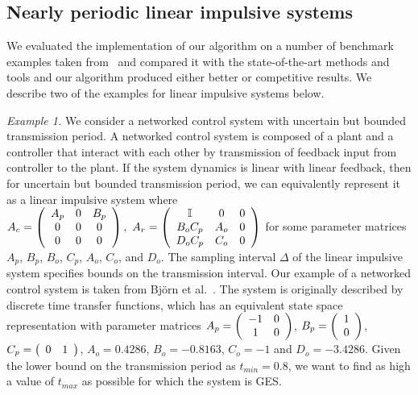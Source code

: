 



\subsection{Nearly periodic linear impulsive systems}\label{sec:lis-ex}

We evaluated the implementation of our algorithm on a number of
benchmark examples taken from~\cite{arvind2016lis} and compared it
with the state-of-the-art methods and tools and our algorithm produced
either better or competitive results.  We describe two of the examples
for linear impulsive systems below.

\emph{Example 1.} We consider a networked control system with
uncertain but bounded transmission period.  A networked control system
is composed of a plant and a controller that interact with each other
by transmission of feedback input from controller to the plant.  If
the system dynamics is linear with linear feedback, then for uncertain
but bounded transmission period, we can equivalently represent it
as a linear impulsive system where $A_c=\left(\begin{array}{ccc} A_p & 0 & B_p\\ 0 & 0 &
  0\\ 0 & 0 & 0
\end{array}\right),~A_r=\left(\begin{array}{ccc}
\mathbb{I} & 0 & 0\\
B_oC_p & A_o & 0\\
D_oC_p & C_o & 0
\end{array}\right)$ for some parameter matrices $A_p$, $B_p$, $B_o$,
$C_p$, $A_o$, $C_o$, and $D_o$.  The sampling interval $\Delta$ of the
linear impulsive system specifies bounds on the transmission interval.
%
Our example of a networked control system is taken from Bj\"{o}rn et
al.~\cite{wittenmark2002computer}.  The system is originally described
by discrete time transfer functions, which has an equivalent state
space representation with parameter matrices
$A_p=\left(\begin{array}{cc}-1 & 0\\ 1 & 0\end{array}\right)$,
  $B_p=\left(\begin{array}{c}1\\ 0\end{array}\right)$,
    $C_p=\left(\begin{array}{cc}0 & 1\end{array}\right)$, $A_o=0.4286$,
      $B_o=-0.8163$, $C_o=-1$ and $D_o=-3.4286$.  Given the lower
      bound on the transmission period as $t_{min}=0.8$, we want to
      find as high a value of $t_{max}$ as possible for which the
      system is GES.

